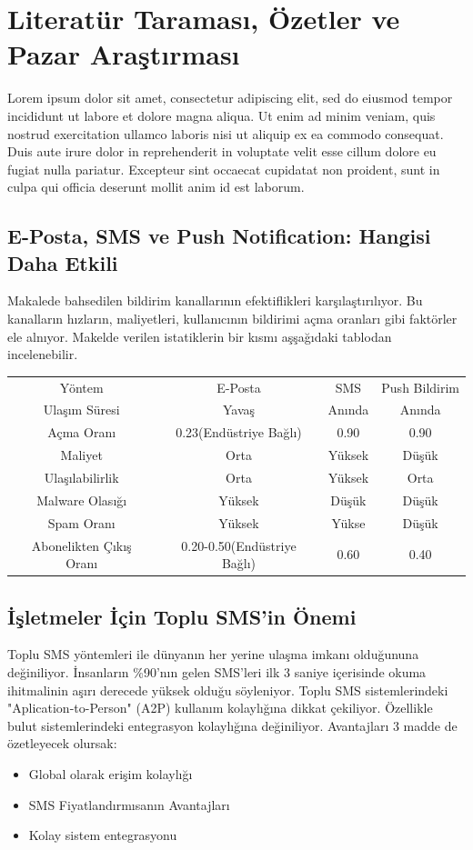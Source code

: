 \section{Literatür Taraması, Özetler ve Pazar Araştırması}
Lorem ipsum dolor sit amet, consectetur adipiscing elit, sed do eiusmod tempor incididunt ut labore et dolore magna aliqua. Ut enim ad minim veniam, quis nostrud exercitation ullamco laboris nisi ut aliquip ex ea commodo consequat. Duis aute irure dolor in reprehenderit in voluptate velit esse cillum dolore eu fugiat nulla pariatur. Excepteur sint occaecat cupidatat non proident, sunt in culpa qui officia deserunt mollit anim id est laborum.



\subsection{E-Posta, SMS ve Push Notification: Hangisi Daha Etkili}
Makalede bahsedilen bildirim kanallarının efektiflikleri karşılaştırılıyor. Bu kanalların hızların, maliyetleri, kullanıcının bildirimi açma oranları gibi faktörler ele alnıyor. Makelde verilen istatiklerin bir kısmı aşşağıdaki tablodan incelenebilir.\cite{socilamediatoday}
\begin{center}
\begin{tabular}{ c | c | c | c }
 Yöntem & E-Posta & SMS & Push Bildirim \\ 
 Ulaşım Süresi & Yavaş & Anında & Anında  \\  
 Açma Oranı & 0.23(Endüstriye Bağlı) & 0.90 & 0.90  \\
 Maliyet & Orta & Yüksek & Düşük \\
 Ulaşılabilirlik & Orta & Yüksek & Orta \\
 Malware Olasığı & Yüksek & Düşük & Düşük \\
 Spam Oranı & Yüksek & Yükse & Düşük \\
 Abonelikten Çıkış Oranı & 0.20-0.50(Endüstriye Bağlı) & 0.60 & 0.40 
\end{tabular}
\end{center}

\subsection{İşletmeler İçin Toplu SMS'in Önemi}
Toplu SMS yöntemleri ile dünyanın her yerine ulaşma imkanı olduğununa değiniliyor. İnsanların \%90'nın gelen SMS'leri ilk 3 saniye içerisinde okuma ihitmalinin aşırı derecede yüksek olduğu söyleniyor. Toplu SMS sistemlerindeki "Aplication-to-Person" (A2P) kullanım kolaylığına dikkat çekiliyor. Özellikle bulut sistemlerindeki entegrasyon kolaylığına değiniliyor.\cite{clickatell} Avantajları 3 madde de özetleyecek olursak:
\begin{itemize}
  \item Global olarak erişim kolaylığı
  \item SMS Fiyatlandırmısanın Avantajları
  \item Kolay sistem entegrasyonu
\end{itemize}
